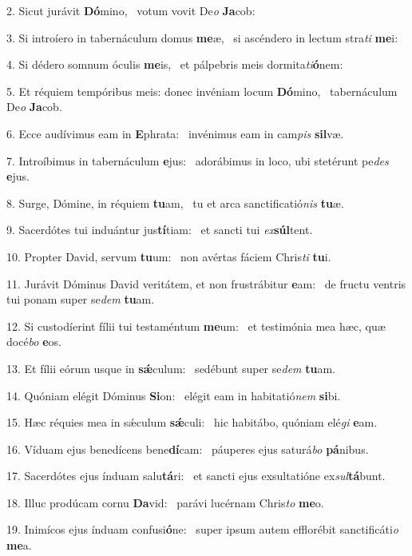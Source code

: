 2. Sicut jurávit \textbf{Dó}mino, \ast\  votum vovit De\textit{o} \textbf{Ja}cob:\

3. Si introíero in tabernáculum domus \textbf{me}æ, \ast\  si ascéndero in lectum stra\textit{ti} \textbf{me}i:\

4. Si dédero somnum óculis \textbf{me}is, \ast\  et pálpebris meis dormita\textit{ti}\textbf{ó}nem:\

5. Et réquiem tempóribus meis: donec invéniam locum \textbf{Dó}mino, \ast\  tabernáculum De\textit{o} \textbf{Ja}cob.\

6. Ecce audívimus eam in \textbf{E}phrata: \ast\  invénimus eam in cam\textit{pis} \textbf{sil}væ.\

7. Introíbimus in tabernáculum \textbf{e}jus: \ast\  adorábimus in loco, ubi stetérunt pe\textit{des} \textbf{e}jus.\

8. Surge, Dómine, in réquiem \textbf{tu}am, \ast\  tu et arca sanctificatió\textit{nis} \textbf{tu}æ.\

9. Sacerdótes tui induántur jus\textbf{tí}tiam: \ast\  et sancti tui \textit{ex}\textbf{súl}tent.\

10. Propter David, servum \textbf{tu}um: \ast\  non avértas fáciem Chris\textit{ti} \textbf{tu}i.\

11. Jurávit Dóminus David veritátem, et non frustrábitur \textbf{e}am: \ast\  de fructu ventris tui ponam super se\textit{dem} \textbf{tu}am.\

12. Si custodíerint fílii tui testaméntum \textbf{me}um: \ast\  et testimónia mea hæc, quæ docé\textit{bo} \textbf{e}os.\

13. Et fílii eórum usque in \textbf{sǽ}culum: \ast\  sedébunt super se\textit{dem} \textbf{tu}am.\

14. Quóniam elégit Dóminus \textbf{Si}on: \ast\  elégit eam in habitatió\textit{nem} \textbf{si}bi.\

15. Hæc réquies mea in sǽculum \textbf{sǽ}culi: \ast\  hic habitábo, quóniam elé\textit{gi} \textbf{e}am.\

16. Víduam ejus benedícens bene\textbf{dí}cam: \ast\  páuperes ejus saturá\textit{bo} \textbf{pá}nibus.\

17. Sacerdótes ejus índuam salu\textbf{tá}ri: \ast\  et sancti ejus exsultatióne ex\textit{sul}\textbf{tá}bunt.\

18. Illuc prodúcam cornu \textbf{Da}vid: \ast\  parávi lucérnam Chris\textit{to} \textbf{me}o.\

19. Inimícos ejus índuam confusi\textbf{ó}ne: \ast\  super ipsum autem efflorébit sanctificáti\textit{o} \textbf{me}a.\

